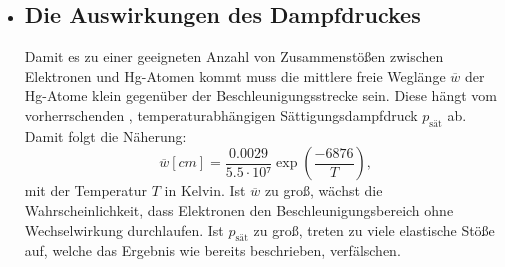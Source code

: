\begin{itemize}
\item\subsection{Die Auswirkungen des Dampfdruckes}
Damit es zu einer geeigneten Anzahl von Zusammenstößen zwischen Elektronen und Hg-Atomen
kommt muss die mittlere freie Weglänge $\overline{w}$ der Hg-Atome klein gegenüber
der Beschleunigungsstrecke sein. Diese hängt vom vorherrschenden , temperaturabhängigen
Sättigungsdampfdruck $p_\text{sät}$ ab. Damit folgt
die Näherung:
\begin{equation}
  \overline{w} [cm] = \frac{0.0029}{5.5 \cdot 10⁷} \exp \left(\frac{-6876}{T}\right)\text{,}\label{eq:w}
  \end{equation}
  mit der Temperatur $T$ in Kelvin. Ist $\overline{w}$ zu groß, wächst die Wahrscheinlichkeit,
  dass Elektronen den Beschleunigungsbereich ohne Wechselwirkung durchlaufen. Ist
  $p_\text{sät}$ zu groß, treten zu viele elastische Stöße auf, welche das Ergebnis
  wie bereits beschrieben, verfälschen.
\end{itemize}

